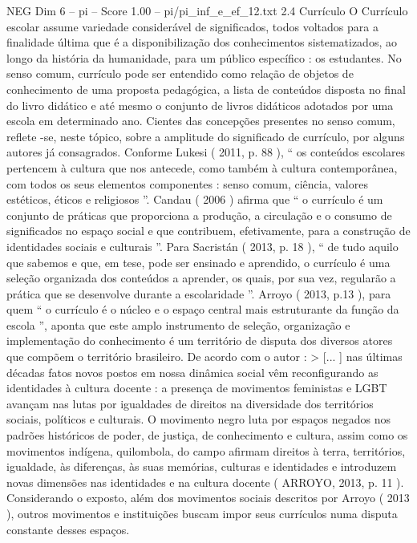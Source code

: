 \begin{textsample}{NEG Dim 6 – pi – Score 1.00 – pi/pi\_inf\_e\_ef\_12.txt}  \label{ex:f6_neg_095}
2.4 Currículo O Currículo escolar assume variedade considerável de significados, todos voltados para a finalidade última que é a disponibilização dos conhecimentos sistematizados, ao longo da história da humanidade, para um público específico : os estudantes.
No senso comum, currículo pode ser entendido como relação de objetos de conhecimento de uma proposta pedagógica, a lista de conteúdos disposta no final do livro didático e até mesmo o conjunto de livros didáticos adotados por uma escola em determinado ano.
Cientes das concepções presentes no senso comum, reflete -se, neste tópico, sobre a amplitude do significado de currículo, por alguns autores já consagrados.
Conforme Lukesi ( 2011, p. 88 ), “ os conteúdos escolares pertencem à cultura que nos antecede, como também à cultura contemporânea, com todos os seus elementos componentes : senso comum, ciência, valores estéticos, éticos e religiosos ”.
Candau ( 2006 ) afirma que “ o currículo é um conjunto de práticas que proporciona a produção, a circulação e o consumo de significados no espaço social e que contribuem, efetivamente, para a construção de identidades sociais e culturais ”.
Para Sacristán ( 2013, p. 18 ), “ de tudo aquilo que sabemos e que, em tese, pode ser ensinado e aprendido, o currículo é uma seleção organizada dos conteúdos a aprender, os quais, por sua vez, regularão a prática que se desenvolve durante a escolaridade ”.
Arroyo ( 2013, p.13 ), para quem “ o currículo é o núcleo e o espaço central mais estruturante da função da escola ”, aponta que este amplo instrumento de seleção, organização e implementação do conhecimento é um território de disputa dos diversos atores que compõem o território brasileiro.
De acordo com o autor : > [... ] nas últimas décadas fatos novos postos em nossa dinâmica social vêm reconfigurando as identidades à cultura docente : a presença de movimentos feministas e LGBT avançam nas lutas por igualdades de direitos na diversidade dos territórios sociais, políticos e culturais.
O movimento negro luta por espaços negados nos padrões históricos de poder, de justiça, de conhecimento e cultura, assim como os movimentos indígena, quilombola, do campo afirmam direitos à terra, territórios, igualdade, às diferenças, às suas memórias, culturas e identidades e introduzem novas dimensões nas identidades e na cultura docente ( ARROYO, 2013, p. 11 ).
Considerando o exposto, além dos movimentos sociais descritos por Arroyo ( 2013 ), outros movimentos e instituições buscam impor seus currículos numa disputa constante desses espaços.

\end{textsample}
